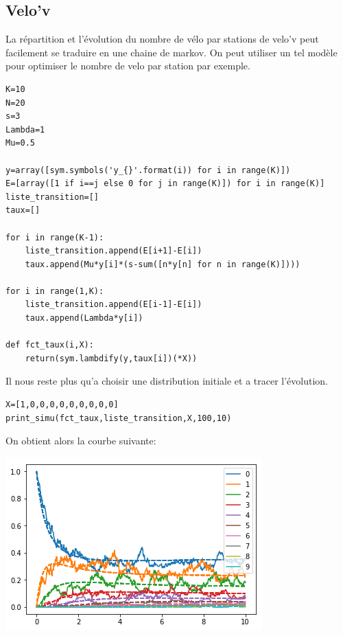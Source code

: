 \documentclass[a4paper]{article}
\begin{document}
\subsection{Velo'v}
La répartition et l'évolution du nombre de vélo par stations de velo'v
peut facilement se traduire en une chaine de markov. On peut utiliser
un tel modèle \cite{velov} pour optimiser le nombre de velo par station par
exemple.

\begin{lstlisting}[frame=single]
K=10
N=20
s=3
Lambda=1
Mu=0.5

y=array([sym.symbols('y_{}'.format(i)) for i in range(K)])
E=[array([1 if i==j else 0 for j in range(K)]) for i in range(K)]
liste_transition=[]
taux=[]

for i in range(K-1):
    liste_transition.append(E[i+1]-E[i])
    taux.append(Mu*y[i]*(s-sum([n*y[n] for n in range(K)])))
    
for i in range(1,K):
    liste_transition.append(E[i-1]-E[i])
    taux.append(Lambda*y[i])
    
def fct_taux(i,X):
    return(sym.lambdify(y,taux[i])(*X))
\end{lstlisting}

Il nous reste plus qu'a choisir une distribution initiale et a tracer
l'évolution.

\begin{lstlisting}[frame=single]
X=[1,0,0,0,0,0,0,0,0,0]
print_simu(fct_taux,liste_transition,X,100,10)
\end{lstlisting}

On obtient alors la courbe suivante:

\includegraphics{velov.png}
\end{document}
